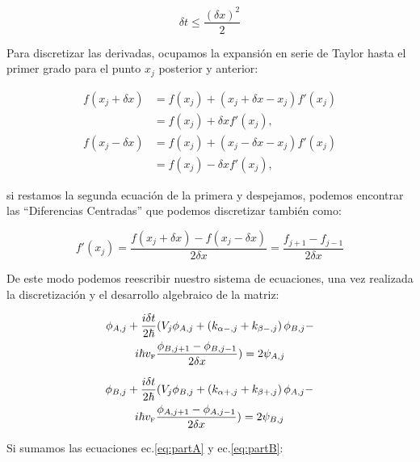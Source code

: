 \begin{equation}
    \label{eq:stabilityCondition}
    \delta t \leq \frac{\left( \delta x \right)^2}{2}
\end{equation}

Para discretizar las derivadas, ocupamos la expansión en serie de Taylor hasta el primer grado para el punto $x_j$ posterior y anterior:

\begin{align}
    \label{eq:TaylorBeforeAndAfter}
    f(x_j+\delta x)&=f(x_j) + (x_j+\delta x-x_j)f'(x_j)\nonumber\\
    &=f(x_j)+\delta xf'(x_j),\nonumber\\
    f(x_j-\delta x)&=f(x_j) + (x_j-\delta x-x_j)f'(x_j)\nonumber\\
    &=f(x_j)-\delta xf'(x_j),
\end{align}

\noindent si restamos la segunda ecuación de la primera y despejamos, podemos encontrar las ``Diferencias Centradas'' que podemos discretizar también como:

\begin{equation}
    \label{eq:diferenciasCentradas}
    f'(x_j)=\frac{f(x_j+\delta x)-f(x_j-\delta x)}{2\delta x} = \frac{f_{j+1}-f_{j-1}}{2\delta x}
\end{equation}

De este modo podemos reescribir nuestro sistema de ecuaciones, una vez realizada la discretización y el desarrollo algebraico de la matriz:

\begin{multline}
    \label{eq:partA}
    \phi_{A, j} + \frac{i\delta t}{2\hbar}(V_j\phi_{A,j} + \left(k_{\alpha-,j}+k_{\beta-,j}\right)\phi_{B,j}-\\
    i\hbar v_{\mbox{\tiny F}}\frac{\phi_{B, j+1}-\phi_{B, j-1}}{2\delta x}) = 2\psi_{A,j}
\end{multline}

\begin{multline}
    \label{eq:partB}
    \phi_{B, j} + \frac{i\delta t}{2\hbar}(V_j\phi_{B,j} + \left(k_{\alpha+,j}+k_{\beta+,j}\right)\phi_{A,j}-\\
    i\hbar v_{\mbox{\tiny F}}\frac{\phi_{A, j+1}-\phi_{A, j-1}}{2\delta x}) = 2\psi_{B,j}
\end{multline}

Si sumamos las ecuaciones ec.\eqref{eq:partA} y ec.\eqref{eq:partB}:

